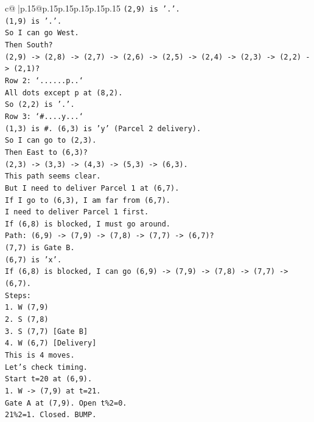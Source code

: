 \documentclass{article}
\begin{document}
{\begin{supertabular}{c@{$\;$}|p{.15\linewidth}@{}p{.15\linewidth}p{.15\linewidth}p{.15\linewidth}p{.15\linewidth}p{.15\linewidth}}
{{{\texttt{(2,9) is '.'.} \\
\texttt{(1,9) is '.'.} \\
\texttt{So I can go West.} \\
\texttt{Then South?} \\
\texttt{(2,9) {-}> (2,8) {-}> (2,7) {-}> (2,6) {-}> (2,5) {-}> (2,4) {-}> (2,3) {-}> (2,2) {-}> (2,1)?} \\
\texttt{Row 2: `......p..`} \\
\texttt{All dots except p at (8,2).} \\
\texttt{So (2,2) is '.'.} \\
\texttt{Row 3: `\#....y...`} \\
\texttt{(1,3) is \#. (6,3) is 'y' (Parcel 2 delivery).} \\
\texttt{So I can go to (2,3).} \\
\texttt{Then East to (6,3)?} \\
\texttt{(2,3) {-}> (3,3) {-}> (4,3) {-}> (5,3) {-}> (6,3).} \\
\texttt{This path seems clear.} \\
\texttt{But I need to deliver Parcel 1 at (6,7).} \\
\texttt{If I go to (6,3), I am far from (6,7).} \\
\texttt{I need to deliver Parcel 1 first.} \\
\texttt{If (6,8) is blocked, I must go around.} \\
\texttt{Path: (6,9) {-}> (7,9) {-}> (7,8) {-}> (7,7) {-}> (6,7)?} \\
\texttt{(7,7) is Gate B.} \\
\texttt{(6,7) is 'x'.} \\
\texttt{If (6,8) is blocked, I can go (6,9) {-}> (7,9) {-}> (7,8) {-}> (7,7) {-}> (6,7).} \\
\texttt{Steps:} \\
\texttt{1. W (7,9)} \\
\texttt{2. S (7,8)} \\
\texttt{3. S (7,7) {[}Gate B{]}} \\
\texttt{4. W (6,7) {[}Delivery{]}} \\
\texttt{This is 4 moves.} \\
\texttt{Let's check timing.} \\
\texttt{Start t=20 at (6,9).} \\
\texttt{1. W {-}> (7,9) at t=21.} \\
\texttt{Gate A at (7,9). Open t\%2=0.} \\
\texttt{21\%2=1. Closed. BUMP.} \\
}}}
\end{supertabular}}
\end{document}
